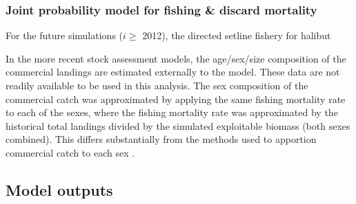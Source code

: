 \subsubsection{Joint probability model for fishing \& discard mortality} %
\label{ssub:joint_probability_for_fishing_&_discard_mortality}
For the future simulations ($i\geq$ 2012), the directed setline fishery for halibut 


In the more recent stock assessment models, the age/sex/size composition of the commercial landings are estimated externally to the model.  These data are not readily available to be used in this analysis.  The sex composition of the commercial catch was approximated by applying the same fishing mortality rate to each of the sexes, where the fishing mortality rate was approximated by the historical total landings divided by the simulated exploitable biomass (both sexes combined).  This differs substantially from the methods used to apportion commercial catch to each sex \cite[see][for details]{clark2004method}.



\subsection{Model outputs} %
\label{sub:model_outputs}




